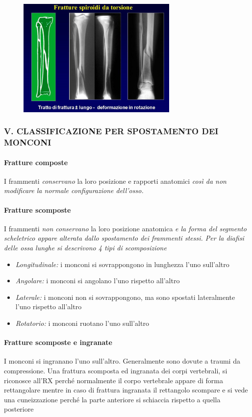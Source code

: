 \begin{figure}[!ht]
\centering
\includegraphics[width=0.7\textwidth]{002/image5.png}
\end{figure}


\subsubsection{V. CLASSIFICAZIONE PER SPOSTAMENTO DEI MONCONI}

\paragraph{Fratture composte}
I frammenti \emph{conservano} la loro posizione e rapporti anatomici \emph{così da non modificare la normale configurazione dell'osso.}
\paragraph{Fratture scomposte} 
I frammenti \emph{non conservano} la loro posizione anatomica \emph{e la forma del segmento scheletrico appare alterata dallo spostamento dei frammenti stessi. Per la diafisi delle ossa lunghe si descrivono 4 tipi di scomposizione}

\begin{itemize}
\item
  \emph{Longitudinale:} i monconi si sovrappongono in lunghezza l'uno sull'altro
\item
  \emph{Angolare:} i monconi si angolano l'uno rispetto all'altro
\item
  \emph{Laterale:} i monconi non si sovrappongono, ma sono spostati lateralmente l'uno rispetto all'altro
\item
  \emph{Rotatorio:} i monconi ruotano l'uno sull'altro
\end{itemize}

\paragraph{Fratture scomposte e ingranate} 
I monconi si ingranano l'uno sull'altro. Generalmente sono dovute a traumi da compressione. Una frattura scomposta ed ingranata dei corpi vertebrali, si riconosce all'RX perché normalmente il corpo vertebrale appare di forma rettangolare mentre in caso di frattura ingranata il rettangolo scompare e si vede una cuneizzazione perché la parte anteriore si schiaccia rispetto a quella posteriore

